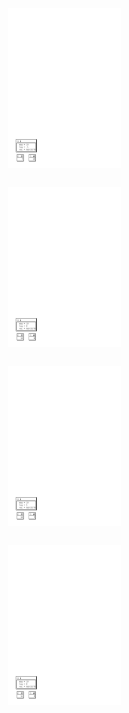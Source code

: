 	\begin{figure}[H]
		\begin{subfigure}[c]{0.33\textwidth}
			\centering
			\includegraphics[width=3cm,clip=true,trim=1cm 1cm 15cm 24cm]{../tests/ddd_graph/ddd_4_0}
		\end{subfigure}
		\begin{subfigure}[c]{0.33\textwidth}
			\centering
			\includegraphics[width=3cm,clip=true,trim=1cm 1cm 15cm 24cm]{../tests/ddd_graph/ddd_4_1}
		\end{subfigure}
		\begin{subfigure}[c]{0.33\textwidth}
			\centering
			\includegraphics[width=3cm,clip=true,trim=1cm 1cm 15cm 24cm]{../tests/ddd_graph/ddd_4_2}
		\end{subfigure}
		\begin{subfigure}[c]{0.33\textwidth}
			\centering
			\includegraphics[width=3cm,clip=true,trim=1cm 1cm 15cm 24cm]{../tests/ddd_graph/ddd_4_3}

\end{subfigure}
\end{figure}
